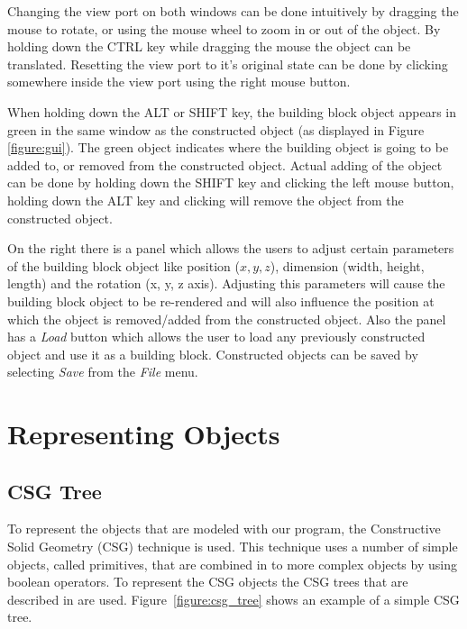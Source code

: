 \documentclass[a4paper,10pt,twocolumn]{article}
\begin{document}
Changing the view port on both windows can be done intuitively by dragging the mouse to rotate, or using the mouse wheel to zoom in or out of the object. By holding down the CTRL key while dragging the mouse the object can be translated. Resetting the view port to it's original state can be done by clicking somewhere inside the view port using the right mouse button.

When holding down the ALT or SHIFT key, the building block object appears in green in the same window as the constructed object (as displayed in Figure \ref{figure:gui}). The green object indicates where the building object is going to be added to, or removed from the constructed object. Actual adding of the object can be done by holding down the SHIFT key and clicking the left mouse button, holding down the ALT key and clicking will remove the object from the constructed object.

On the right there is a panel which allows the users to adjust certain parameters of the building block object like position ($x, y, z$), dimension (width, height, length) and the rotation (x, y, z axis). Adjusting this parameters will cause the building block object to be re-rendered and will also influence the position at which the object is removed/added from the constructed object. Also the panel has a \textit{Load} button which allows the user to load any previously constructed object and use it as a building block. Constructed objects can be saved by selecting \textit{Save} from the \textit{File} menu.

\section{Representing Objects}
\label{chapt:repobj}

\subsection{CSG Tree}
    To represent the objects that are modeled with our program, the Constructive Solid Geometry (CSG) technique is used. This technique uses a number of simple objects, called primitives, that are combined in to more complex objects by using boolean operators. To represent the CSG objects the CSG trees that are described in \cite{Wiegand96} are used. Figure~\ref{figure:csg_tree} shows an example of a simple CSG tree.
\end{document}
